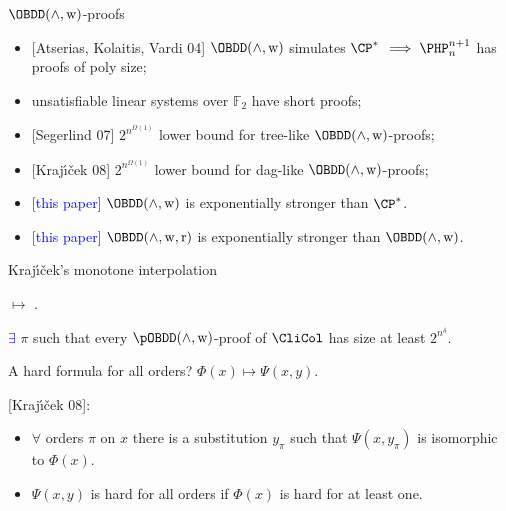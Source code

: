 \begin{frame}{$\OBDD(\land, \weakening)$-proofs}
    \begin{itemize}
        \item{} [Atserias, Kolaitis, Vardi 04] $\OBDD(\land, \weakening)$ simulates $\CP^*$
            \pause $\implies \PHP^{n + 1}_n$ has proofs of poly size;
        \pause
        \item{} unsatisfiable linear systems over $\mathbb{F}_2$ have short proofs;
        \pause
        \item{} [Segerlind 07] $2^{n^{\Omega(1)}}$ lower bound for tree-like $\OBDD(\land,
            \weakening)$-proofs;
        \pause
        \item{} [Kraj{\'{\i}}{\v{c}}ek 08] $2^{n^{\Omega(1)}}$ lower bound for dag-like $\OBDD(\land,
            \weakening)$-proofs;
        \pause
        \item{} \textcolor{blue}{[this paper]} $\OBDD(\land, \weakening)$ is exponentially stronger than $\CP^*$.
        \pause
        \item{} \textcolor{blue}{[this paper]} $\OBDD(\land, \weakening,
            \reordering)$ is exponentially stronger than $\OBDD(\land, \weakening)$.
    \end{itemize}
\end{frame}

\begin{frame}{Kraj{\'{\i}}{\v{c}}ek's monotone interpolation}

     $\mapsto$
    .

    \pause

    \begin{theorem}
        \textcolor{blue}{$\exists$} $\pi$ such that every $\pOBDD(\land,
        \weakening)$-proof of $\CliCol$ has size at least $2^{n^{\delta}}$.
    \end{theorem}

    \pause
    A hard formula for all orders? \pause $\Phi(x) \mapsto \Psi(x, y)$.

    \pause
    {[Kraj{\'{\i}}{\v{c}}ek 08]}:
    \begin{itemize}
        \item $\forall$ orders $\pi$ on $x$ there is a substitution $y_{\pi}$ such that $\Psi(x,
            y_{\pi})$ is isomorphic to $\Phi(x)$.
        \item $\Psi(x, y)$ is hard for all orders if $\Phi(x)$ is hard for at least one.
    \end{itemize}
\end{frame}

